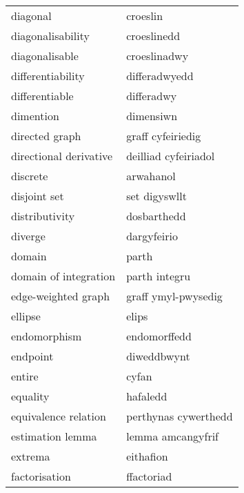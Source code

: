 \begin{supertabular}{p{0.22\textwidth}p{0.22\textwidth}}
                         diagonal &                         croeslin \\
                diagonalisability &                      croeslinedd \\
                   diagonalisable &                     croeslinadwy \\
                differentiability &                    differadwyedd \\
                   differentiable &                       differadwy \\
                        dimention &                        dimensiwn \\
                   directed graph &                graff cyfeiriedig \\
           directional derivative &             deilliad cyfeiriadol \\
                         discrete &                        arwahanol \\
                     disjoint set &                    set digyswllt \\
                   distributivity &                      dosbarthedd \\
                          diverge &                      dargyfeirio \\
                           domain &                            parth \\
            domain of integration &                    parth integru \\
              edge-weighted graph &              graff ymyl-pwysedig \\
                          ellipse &                            elips \\
                     endomorphism &                     endomorffedd \\
                         endpoint &                      diweddbwynt \\
                           entire &                            cyfan \\
                         equality &                         hafaledd \\
             equivalence relation &             perthynas cywerthedd \\
                 estimation lemma &                lemma amcangyfrif \\
                          extrema &                        eithafion \\
                    factorisation &                       ffactoriad \\

\end{supertabular}

